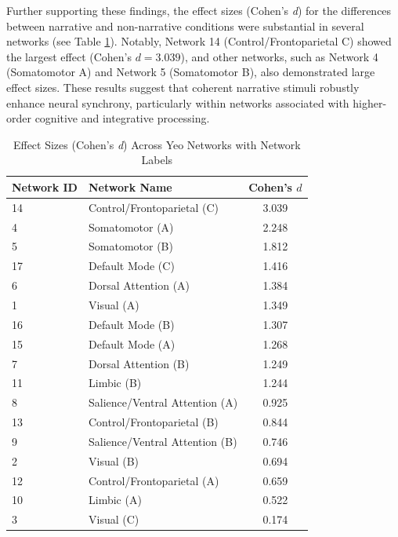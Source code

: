 \documentclass[stu,12pt,floatsintext]{apa7}
\begin{document}
Further supporting these findings, the effect sizes (Cohen's \emph{d}) for the differences between narrative and non-narrative conditions were substantial in several networks (see Table \ref{tab:effectSize}). Notably, Network 14 (Control/Frontoparietal C) showed the largest effect (Cohen's $d = 3.039$), and other networks, such as Network 4 (Somatomotor A) and Network 5 (Somatomotor B), also demonstrated large effect sizes. These results suggest that coherent narrative stimuli robustly enhance neural synchrony, particularly within networks associated with higher-order cognitive and integrative processing.

\begin{table}[ht!]
\centering
\caption{Effect Sizes (Cohen's \emph{d}) Across Yeo Networks with Network Labels}
\label{tab:effectSize}
\begin{tabular}{llc}
\hline
\textbf{Network ID} & \textbf{Network Name} & \textbf{Cohen's $d$} \\
\hline
14 & Control/Frontoparietal (C)          & 3.039 \\
4  & Somatomotor (A)                     & 2.248 \\
5  & Somatomotor (B)                     & 1.812 \\
17 & Default Mode (C)                    & 1.416 \\
6  & Dorsal Attention (A)                & 1.384 \\
1  & Visual (A)                          & 1.349 \\
16 & Default Mode (B)                    & 1.307 \\
15 & Default Mode (A)                    & 1.268 \\
7  & Dorsal Attention (B)                & 1.249 \\
11 & Limbic (B)                          & 1.244 \\
8  & Salience/Ventral Attention (A)      & 0.925 \\
13 & Control/Frontoparietal (B)          & 0.844 \\
9  & Salience/Ventral Attention (B)      & 0.746 \\
2  & Visual (B)                          & 0.694 \\
12 & Control/Frontoparietal (A)          & 0.659 \\
10 & Limbic (A)                          & 0.522 \\
3  & Visual (C)                          & 0.174 \\
\hline
\end{tabular}
\end{table}
\end{document}
